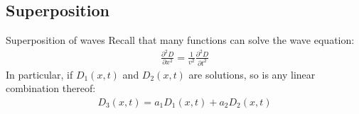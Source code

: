 \documentclass[aspectratio=169,
hyperref={colorlinks,urlcolor=blue}
]{beamer}
\begin{document}
\subsection{Superposition}
\label{subsec:superposition}
\begin{frame}{Superposition of waves}
Recall that many functions can solve the wave equation:
\begin{align*}
\frac{\partial^2D}{\partial x^2}=\frac{1}{v^2}\frac{\partial^2D}{\partial t^2}
\end{align*}
In particular, if $D_1(x,t)$ and $D_2(x,t)$ are solutions, so is any linear combination thereof:
\begin{align*}
D_3(x,t)=a_1D_1(x,t)+a_2D_2(x,t)
\end{align*}
\end{frame}



\end{document}
